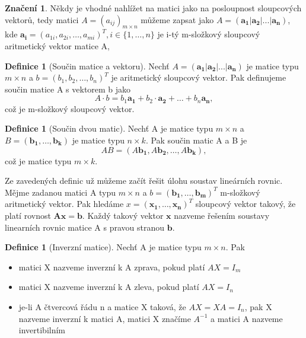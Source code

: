 \documentclass{article}
\theoremstyle{plain}
\theoremstyle{definition}
\newtheorem{definice}[veta]{Definice}
\newtheorem*{znaceni}{Značení}
\begin{document}
\begin{znaceni}
Někdy je vhodné nahlížet na matici jako na posloupnost sloupcových vektorů, tedy matici $A=(a_{ij})_{m \times n}$ můžeme zapsat jako $A=( \mathbf{a_1}|\mathbf{a_2}|...|\mathbf{a_n})$, kde $\mathbf{a_i}=(a_{1i},a_{2i},\hdots,a_{mi})^T,i \in \{1,\hdots,n\}$ je i-tý m-složkový sloupcový aritmetický vektor matice A,
\end{znaceni}

\begin{definice}[Součin matice a vektoru]
Nechť $A=( \mathbf{a_1}|\mathbf{a_2}|...|\mathbf{a_n})$ je matice typu $m \times n$ a $b=(b_1,b_2,\hdots,b_n)^T$ je aritmetický sloupcový vektor. Pak definujeme součin matice A s vektorem b jako $$A\cdot b= b_1 \mathbf{a_1} + b_2 \cdot \mathbf{a_2}+\hdots+b_n\mathbf{a_n},$$ což je m-složkový sloupcový vektor.
\end{definice}


\begin{definice}[Součin dvou matic]
Nechť A je matice typu $m \times n$ a $B=(\mathbf{b_1},\hdots,\mathbf{b_k})$ je matice typu $n \times k$. Pak součin matic A a B je $$AB=(A\mathbf{b_1},A\mathbf{b_2},\hdots,A\mathbf{b_k}),$$ což je matice typu $m \times k$.
\end{definice}
Ze zavedených definic už můžeme začít řešit úlohu soustav lineárních rovnic.
Mějme zadanou matici A typu $m \times n$ a $b=(\mathbf{b_1},\hdots,\mathbf{b_m})^T$ m-složkový aritmetický vektor. Pak hledáme $x=(\mathbf{x_1},\hdots,\mathbf{x_n})^T$ sloupcový vektor takový, že platí rovnost $\mathbf{Ax=b}$. Každý takový vektor $\mathbf{x}$ nazveme řešením soustavy linearních rovnic matice A s pravou stranou $\mathbf{b}$.

\begin{definice}[Inverzní matice]
Nechť A je matice typu $m \times n $. Pak
\begin{itemize}
    \item matici X nazveme inverzní k A zprava, pokud platí $AX=I_m$
    \item matici X nazveme inverzní k A zleva, pokud platí $AX=I_n$
    \item je-li A čtvercová řádu n a matice X taková, že $AX=XA=I_n$, pak X nazveme inverzní k matici A, matici X značíme $A^{-1}$ a matici A nazveme invertibilním
\end{itemize}
\end{definice}
\end{document}
